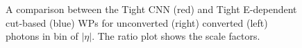 \begin{figure}[htbp]
    \centering
	\begin{tcolorbox}[colback=black!5!white,colframe=white!75!black]
    \caption{A comparison between the Tight CNN (red) and Tight E-dependent cut-based  (blue) WPs for unconverted (right) converted (left) photons in bin of $|\eta|$. The ratio plot shows the scale factors.}
    \label{Eff:Tight:Dep}
    \end{tcolorbox}
    
\end{figure}
